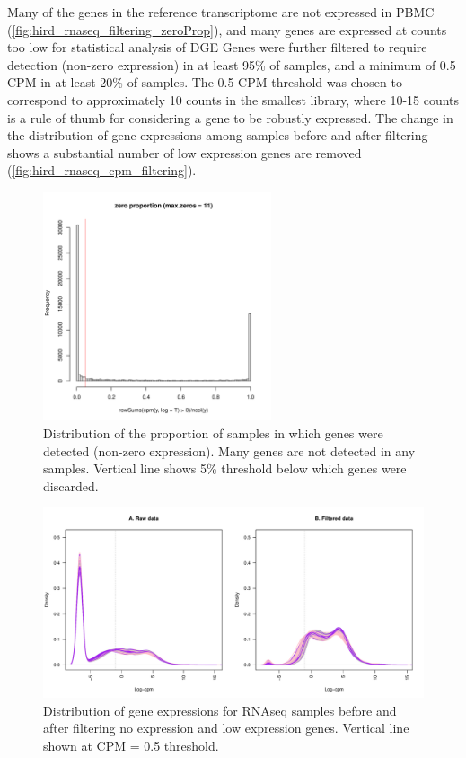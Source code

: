 Many of the genes in the reference transcriptome are not expressed in \gls{PBMC} (\autoref{fig:hird_rnaseq_filtering_zeroProp}), and many genes are expressed at counts too low for statistical analysis of \gls{DGE}
Genes were further filtered to require detection (non-zero expression) in at least 95\% of samples, and a minimum of 0.5 \gls{CPM} in at least 20\% of samples.
The 0.5 \gls{CPM} threshold was chosen to correspond to approximately 10 counts in the smallest library, where 10-15 counts is a rule of thumb for considering a gene to be robustly expressed\autocite{chen2016ReadsGenesPathways}.
The change in the distribution of gene expressions among samples before and after filtering shows a substantial number of low expression genes are removed (\autoref{fig:hird_rnaseq_cpm_filtering}).

\begin{figure}
    \centering
    \includegraphics[width=0.6\textwidth, page=1]{mainmatter/figures/chapter_02/rnaseq_data_setup.gene_zero_prop.pdf}
    \caption{Distribution of the proportion of samples in which genes were detected (non-zero expression). Many genes are not detected in any samples. Vertical line shows 5\% threshold below which genes were discarded.}
    \label{fig:hird_rnaseq_filtering_zeroProp}
\end{figure}

\begin{figure}
    \includegraphics[width=1.0\textwidth]{mainmatter/figures/chapter_02/rnaseq_data_setup.sample_cpm_density_filtered.pdf}
    \caption{Distribution of gene expressions for \gls{RNAseq} samples before and after filtering no expression and low expression genes. Vertical line shown at \gls{CPM} = 0.5 threshold.}
    \label{fig:hird_rnaseq_cpm_filtering}
\end{figure}

